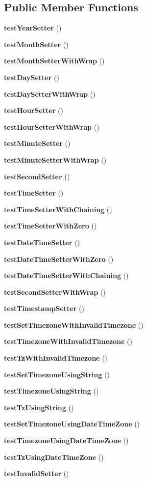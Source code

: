 \subsection*{Public Member Functions}
\begin{DoxyCompactItemize}
\item 
{\bf test\+Year\+Setter} ()
\item 
{\bf test\+Month\+Setter} ()
\item 
{\bf test\+Month\+Setter\+With\+Wrap} ()
\item 
{\bf test\+Day\+Setter} ()
\item 
{\bf test\+Day\+Setter\+With\+Wrap} ()
\item 
{\bf test\+Hour\+Setter} ()
\item 
{\bf test\+Hour\+Setter\+With\+Wrap} ()
\item 
{\bf test\+Minute\+Setter} ()
\item 
{\bf test\+Minute\+Setter\+With\+Wrap} ()
\item 
{\bf test\+Second\+Setter} ()
\item 
{\bf test\+Time\+Setter} ()
\item 
{\bf test\+Time\+Setter\+With\+Chaining} ()
\item 
{\bf test\+Time\+Setter\+With\+Zero} ()
\item 
{\bf test\+Date\+Time\+Setter} ()
\item 
{\bf test\+Date\+Time\+Setter\+With\+Zero} ()
\item 
{\bf test\+Date\+Time\+Setter\+With\+Chaining} ()
\item 
{\bf test\+Second\+Setter\+With\+Wrap} ()
\item 
{\bf test\+Timestamp\+Setter} ()
\item 
{\bf test\+Set\+Timezone\+With\+Invalid\+Timezone} ()
\item 
{\bf test\+Timezone\+With\+Invalid\+Timezone} ()
\item 
{\bf test\+Tz\+With\+Invalid\+Timezone} ()
\item 
{\bf test\+Set\+Timezone\+Using\+String} ()
\item 
{\bf test\+Timezone\+Using\+String} ()
\item 
{\bf test\+Tz\+Using\+String} ()
\item 
{\bf test\+Set\+Timezone\+Using\+Date\+Time\+Zone} ()
\item 
{\bf test\+Timezone\+Using\+Date\+Time\+Zone} ()
\item 
{\bf test\+Tz\+Using\+Date\+Time\+Zone} ()
\item 
{\bf test\+Invalid\+Setter} ()
\end{DoxyCompactItemize}
